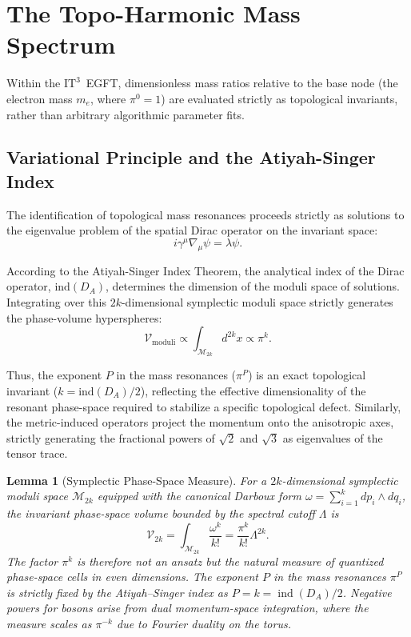 \documentclass[onecolumn,aps,prd,superscriptaddress,nofootinbib,amsmath,amssymb]{revtex4-2}
\newtheorem{lemma}[theorem]{Lemma}
\theoremstyle{definition}
\theoremstyle{remark}
\newcommand{\ITthree}{\ensuremath{\mathrm{IT}^3}}
\begin{document}
\section{The Topo-Harmonic Mass Spectrum}
\label{sec:mass_spectrum}

Within the \ITthree\ EGFT, dimensionless mass ratios relative to the base node (the electron mass $m_e$, where $\pi^0 = 1$) are evaluated strictly as topological invariants, rather than arbitrary algorithmic parameter fits.

\subsection{Variational Principle and the Atiyah-Singer Index}
\label{subsec:variational}

The identification of topological mass resonances proceeds strictly as solutions to the eigenvalue problem of the spatial Dirac operator on the invariant space:
\begin{equation}
i \gamma^\mu \nabla_\mu \psi = \lambda \psi.
\end{equation}

According to the Atiyah-Singer Index Theorem, the analytical index of the Dirac operator, $\text{ind}(D_A)$, determines the dimension of the moduli space of solutions. Integrating over this $2k$-dimensional symplectic moduli space strictly generates the phase-volume hyperspheres:
\begin{equation}
\mathcal{V}_{\text{moduli}} \propto \int_{\mathcal{M}_{2k}} d^{2k}x \propto \pi^k.
\end{equation}

Thus, the exponent $P$ in the mass resonances ($\pi^P$) is an exact topological invariant ($k = \text{ind}(D_A)/2$), reflecting the effective dimensionality of the resonant phase-space required to stabilize a specific topological defect. Similarly, the metric-induced operators project the momentum onto the anisotropic axes, strictly generating the fractional powers of $\sqrt{2}$ and $\sqrt{3}$ as eigenvalues of the tensor trace.

\begin{lemma}[Symplectic Phase-Space Measure]
\label{lem:symplectic_volume}
For a $2k$-dimensional symplectic moduli space $\mathcal{M}_{2k}$ equipped with the canonical Darboux form $\omega = \sum_{i=1}^k dp_i \wedge dq_i$, the invariant phase-space volume bounded by the spectral cutoff $\Lambda$ is
\begin{equation}
\mathcal{V}_{2k} = \int_{\mathcal{M}_{2k}} \frac{\omega^k}{k!} = \frac{\pi^k}{k!} \Lambda^{2k}.
\end{equation}
The factor $\pi^k$ is therefore not an ansatz but the natural measure of quantized phase-space cells in even dimensions. The exponent $P$ in the mass resonances $\pi^P$ is strictly fixed by the Atiyah--Singer index as $P = k = \operatorname{ind}(D_A)/2$. Negative powers for bosons arise from dual momentum-space integration, where the measure scales as $\pi^{-k}$ due to Fourier duality on the torus.
\end{lemma}
\end{document}
